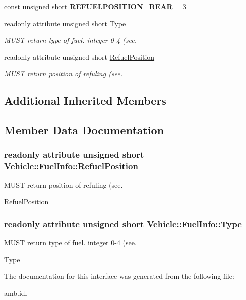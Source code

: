 \begin{DoxyCompactItemize}
\item 
\hypertarget{interfaceVehicle_1_1FuelInfo_a420c9977a7523f7be1ffd8d670068bd7}{const unsigned short {\bfseries R\-E\-F\-U\-E\-L\-P\-O\-S\-I\-T\-I\-O\-N\-\_\-\-R\-E\-A\-R} = 3}\label{interfaceVehicle_1_1FuelInfo_a420c9977a7523f7be1ffd8d670068bd7}

\item 
readonly attribute unsigned short \hyperlink{interfaceVehicle_1_1FuelInfo_a4e5378511dd71a844c3f8f32a4ffa18c}{Type}
\begin{DoxyCompactList}\small\item\em M\-U\-S\-T return type of fuel. integer 0-\/4 (see. \end{DoxyCompactList}\item 
readonly attribute unsigned short \hyperlink{interfaceVehicle_1_1FuelInfo_a7df9498b7b51184a075ecf5b5dd6bf0f}{Refuel\-Position}
\begin{DoxyCompactList}\small\item\em M\-U\-S\-T return position of refuling (see. \end{DoxyCompactList}\end{DoxyCompactItemize}
\subsection*{Additional Inherited Members}


\subsection{Member Data Documentation}
\hypertarget{interfaceVehicle_1_1FuelInfo_a7df9498b7b51184a075ecf5b5dd6bf0f}{
\subsubsection[{Refuel\-Position}]{\setlength{\rightskip}{0pt plus 5cm}readonly attribute unsigned short Vehicle\-::\-Fuel\-Info\-::\-Refuel\-Position}}\label{interfaceVehicle_1_1FuelInfo_a7df9498b7b51184a075ecf5b5dd6bf0f}


M\-U\-S\-T return position of refuling (see. 

Refuel\-Position \hypertarget{interfaceVehicle_1_1FuelInfo_a4e5378511dd71a844c3f8f32a4ffa18c}{
\subsubsection[{Type}]{\setlength{\rightskip}{0pt plus 5cm}readonly attribute unsigned short Vehicle\-::\-Fuel\-Info\-::\-Type}}\label{interfaceVehicle_1_1FuelInfo_a4e5378511dd71a844c3f8f32a4ffa18c}


M\-U\-S\-T return type of fuel. integer 0-\/4 (see. 

Type 

The documentation for this interface was generated from the following file\-:\begin{DoxyCompactItemize}
\item 
amb.\-idl\end{DoxyCompactItemize}
